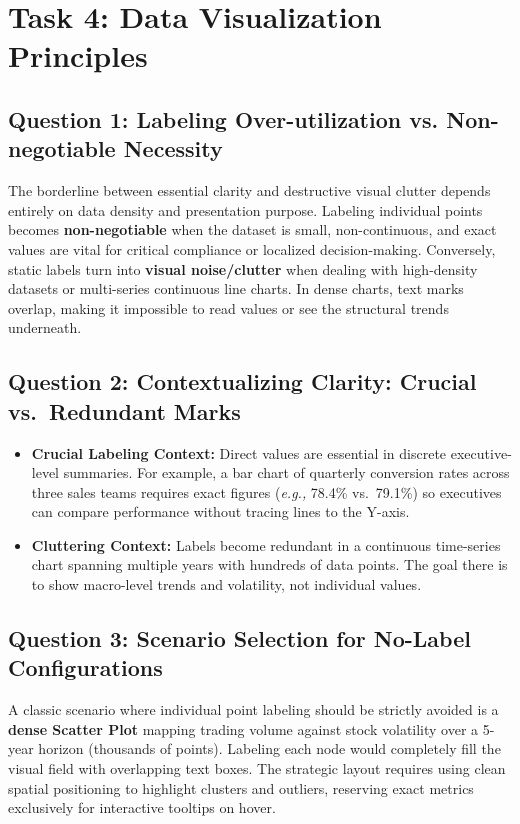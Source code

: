 \documentclass[a4paper,12pt]{extarticle}
\begin{document}
\section{Task 4: Data Visualization Principles}

\subsection{Question 1: Labeling Over-utilization vs. Non-negotiable Necessity}
The borderline between essential clarity and destructive visual clutter depends entirely on data density and presentation purpose. Labeling individual points becomes \textbf{non-negotiable} when the dataset is small, non-continuous, and exact values are vital for critical compliance or localized decision-making. 
Conversely, static labels turn into \textbf{visual noise/clutter} when dealing with high-density datasets or multi-series continuous line charts. In dense charts, text marks overlap, making it impossible to read values or see the structural trends underneath.

\subsection{Question 2: Contextualizing Clarity: Crucial vs.\ Redundant Marks}
\begin{itemize}
    \item \textbf{Crucial Labeling Context:} Direct values are essential in
    discrete executive-level summaries. For example, a bar chart of quarterly
    conversion rates across three sales teams requires exact figures
    (\textit{e.g.,} 78.4\% vs.\ 79.1\%) so executives can compare performance
    without tracing lines to the Y-axis.

    \item \textbf{Cluttering Context:} Labels become redundant in a continuous
    time-series chart spanning multiple years with hundreds of data points.
    The goal there is to show macro-level trends and volatility, not
    individual values.
\end{itemize}


\subsection{Question 3: Scenario Selection for No-Label Configurations}
A classic scenario where individual point labeling should be strictly avoided is a \textbf{dense Scatter Plot} mapping trading volume against stock volatility over a 5-year horizon (thousands of points). Labeling each node would completely fill the visual field with overlapping text boxes. The strategic layout requires using clean spatial positioning to highlight clusters and outliers, reserving exact metrics exclusively for interactive tooltips on hover.
\end{document}
